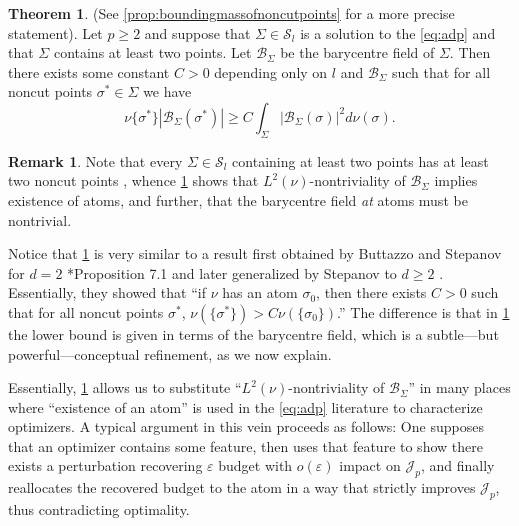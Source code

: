 \documentclass[preprint, reqno]{amsart}
\theoremstyle{definition}
\newtheorem{theorem}[definition]{Theorem}
\newtheorem{remark}[definition]{Remark}
\numberwithin{equation}{section}
\begin{document}
\begin{theorem}\label{theorem:introboundingmassofnoncutpoints} (See
  \cref{prop:boundingmassofnoncutpoints} for a more precise
  statement). Let $p \geq 2$ and suppose that $\Sigma \in
  \mathcal{S}_l$ is a solution to the \eqref{eq:adp} and that $\Sigma$
  contains at least two points. Let $\mathcal{B}_{\Sigma}$ be the
  barycentre field of $\Sigma$. Then there exists some constant $C> 0$
  depending only on $l$ and $\mathcal B_{\Sigma}$ such that for all
  noncut points $\sigma^* \in \Sigma$ we have
  \[
    \nu\{\sigma^*\}|\mathcal{B}_{\Sigma}(\sigma^*)| \geq
    C \int_{\Sigma}
    |\mathcal{B}_{\Sigma}(\sigma)|^2 d\nu(\sigma).
  \]
\end{theorem}

\begin{remark}\label{rmk:barycenter-atom}
  Note that every $\Sigma \in \mathcal S_l$ containing at least two
  points has at least two noncut points \cite[\S 47 Theorem
  IV.5]{kuratowski}, whence
  \cref{theorem:introboundingmassofnoncutpoints} shows that
  $L^2(\nu)$-nontriviality of $\mathcal B_\Sigma$ implies existence of
  atoms, and further, that the barycentre field \emph{at} atoms must
  be nontrivial.
\end{remark}

Notice that \cref{theorem:introboundingmassofnoncutpoints} is very
similar to a result first obtained by Buttazzo and Stepanov for $d=2$
\cite{Buttazzo03}*{Proposition 7.1} and later generalized by Stepanov
to $d \geq 2$ \cite[Theorem 5.5]{Stepanov06}. Essentially, they showed
that ``if $\nu$ has an atom $\sigma_0$, then there exists $C>0$ such
that for all noncut points $\sigma^*$, $\nu(\{\sigma^*\}) > C
\nu(\{\sigma_0\})$.'' The difference is that in
\cref{theorem:introboundingmassofnoncutpoints} the lower bound is
given in terms of the barycentre field, which is a subtle---but
powerful---conceptual refinement, as we now explain.

Essentially, \cref{theorem:introboundingmassofnoncutpoints} allows us
to substitute ``$L^2(\nu)$-nontriviality of $\mathcal B_\Sigma$'' in
many places where ``existence of an atom'' is used in the
\eqref{eq:adp} literature to characterize optimizers. A typical
argument in this vein proceeds as follows: One supposes that an
optimizer contains some feature, then uses that feature to show there
exists a perturbation recovering $\varepsilon$ budget with
$o(\varepsilon)$ impact on $\mathscr J_p$, and finally reallocates the
recovered budget to the atom in a way that strictly improves $\mathscr
J_p$, thus contradicting optimality.
\end{document}
